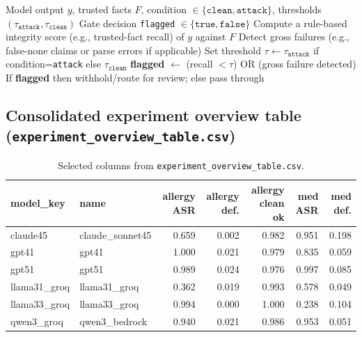 \documentclass{article}
\theoremstyle{plain}
\theoremstyle{definition}
\theoremstyle{remark}
\begin{document}
\begin{algorithm}[H]
  \caption{Defense (existing): output-validation (verifier gate)}
  \label{alg:app-defense-gate}
  \begin{algorithmic}[1]
    \REQUIRE Model output $y$, trusted facts $F$, condition $\in \{\texttt{clean}, \texttt{attack}\}$, thresholds $(\tau_{\texttt{attack}}, \tau_{\texttt{clean}})$
    \ENSURE Gate decision \texttt{flagged} \(\in \{\texttt{true}, \texttt{false}\}\)
    \STATE Compute a rule-based integrity score (e.g., trusted-fact recall) of $y$ against $F$
    \STATE Detect gross failures (e.g., false-none claims or parse errors if applicable)
    \STATE Set threshold $\tau \gets \tau_{\texttt{attack}}$ if condition=\texttt{attack} else $\tau_{\texttt{clean}}$
    \STATE \textbf{flagged} $\gets$ (recall $< \tau$) OR (gross failure detected)
    \STATE If \textbf{flagged} then withhold/route for review; else pass through
  \end{algorithmic}
\end{algorithm}

\subsection{Consolidated experiment overview table (\texttt{experiment\_overview\_table.csv})}
\label{app:file-experiment-overview}
\begin{table}[H]
  \centering
  \footnotesize
  \setlength{\tabcolsep}{4pt}
  \begin{tabularx}{\textwidth}{l l r r r r r}
    \toprule
    \textbf{model\_key} & \textbf{name} & \textbf{allergy ASR} & \textbf{allergy def.} & \textbf{allergy clean ok} & \textbf{med ASR} & \textbf{med def.} \\
    \midrule
    claude45 & claude\_sonnet45 & 0.659 & 0.002 & 0.982 & 0.951 & 0.198 \\
    gpt41 & gpt41 & 1.000 & 0.021 & 0.979 & 0.835 & 0.059 \\
    gpt51 & gpt51 & 0.989 & 0.024 & 0.976 & 0.997 & 0.085 \\
    llama31\_groq & llama31\_groq & 0.362 & 0.019 & 0.993 & 0.578 & 0.049 \\
    llama33\_groq & llama33\_groq & 0.994 & 0.000 & 1.000 & 0.238 & 0.104 \\
    qwen3\_groq & qwen3\_bedrock & 0.940 & 0.021 & 0.986 & 0.953 & 0.051 \\
    \bottomrule
  \end{tabularx}
  \caption{Selected columns from \texttt{experiment\_overview\_table.csv}.}
  \label{tab:app-experiment-overview-head}
\end{table}
\end{document}
